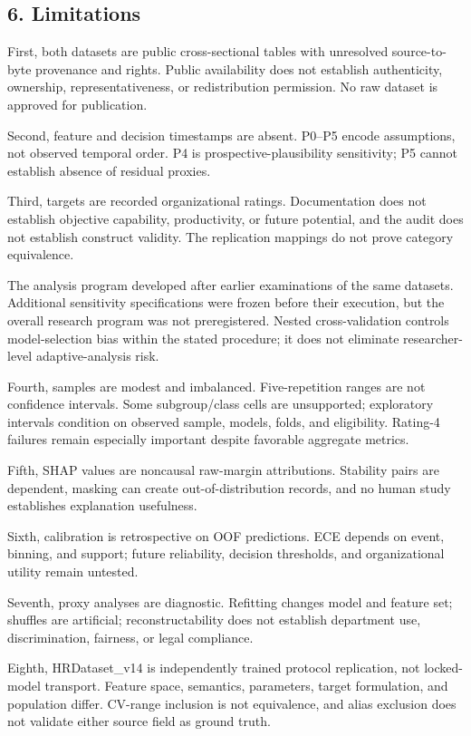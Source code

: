 \documentclass[
  a4paper,
  review]{elsarticle}
\begin{document}
\subsection{6. Limitations}\label{limitations}

First, both datasets are public cross-sectional tables with unresolved
source-to-byte provenance and rights. Public availability does not
establish authenticity, ownership, representativeness, or redistribution
permission. No raw dataset is approved for publication.

Second, feature and decision timestamps are absent. P0--P5 encode
assumptions, not observed temporal order. P4 is prospective-plausibility
sensitivity; P5 cannot establish absence of residual proxies.

Third, targets are recorded organizational ratings. Documentation does
not establish objective capability, productivity, or future potential,
and the audit does not establish construct validity. The replication
mappings do not prove category equivalence.

The analysis program developed after earlier examinations of the same
datasets. Additional sensitivity specifications were frozen before their
execution, but the overall research program was not preregistered.
Nested cross-validation controls model-selection bias within the stated
procedure; it does not eliminate researcher-level adaptive-analysis
risk.

Fourth, samples are modest and imbalanced. Five-repetition ranges are
not confidence intervals. Some subgroup/class cells are unsupported;
exploratory intervals condition on observed sample, models, folds, and
eligibility. Rating-4 failures remain especially important despite
favorable aggregate metrics.

Fifth, SHAP values are noncausal raw-margin attributions. Stability
pairs are dependent, masking can create out-of-distribution records, and
no human study establishes explanation usefulness.

Sixth, calibration is retrospective on OOF predictions. ECE depends on
event, binning, and support; future reliability, decision thresholds,
and organizational utility remain untested.

Seventh, proxy analyses are diagnostic. Refitting changes model and
feature set; shuffles are artificial; reconstructability does not
establish department use, discrimination, fairness, or legal compliance.

Eighth, HRDataset\_v14 is independently trained protocol replication,
not locked-model transport. Feature space, semantics, parameters, target
formulation, and population differ. CV-range inclusion is not
equivalence, and alias exclusion does not validate either source field
as ground truth.
\end{document}
